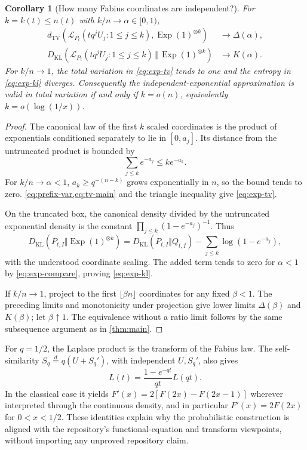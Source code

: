 \documentclass[11pt,a4paper]{article}
\numberwithin{equation}{section}
\newtheorem{corollary}[corollary]{Corollary}
\theoremstyle{definition}
\theoremstyle{remark}
\newcommand{\Pt}{P_t}
\newcommand{\TV}{d_{\mathrm{TV}}}
\newcommand{\KL}{D_{\mathrm{KL}}}
\newcommand{\Exp}{\operatorname{Exp}}
\newcommand{\Law}{\mathcal L}
\begin{document}
\begin{corollary}[How many Fabius coordinates are independent?]
\label{cor:geometric-prefix}
For $k=k(t)\le n(t)$ with $k/n\to\alpha\in[0,1)$,
\begin{align}
 \TV\left(\Law_{\Pt}(tq^jU_j:1\le j\le k),\Exp(1)^{\otimes k}\right)
 &\to\Delta(\alpha),\label{eq:exp-tv}\\
 \KL\left(\Law_{\Pt}(tq^jU_j:1\le j\le k)
       \,\Vert\,\Exp(1)^{\otimes k}\right)&\to K(\alpha).
 \label{eq:exp-kl}
\end{align}
For $k/n\to1$, the total variation in \cref{eq:exp-tv} tends to
one and the entropy in \cref{eq:exp-kl} diverges. Consequently the
independent-exponential approximation is valid in total variation
if and only if $k=o(n)$, equivalently $k=o(\log(1/x))$.
\end{corollary}
\begin{proof}
The canonical law of the first $k$ scaled coordinates is the product
of exponentials conditioned separately to lie in $[0,a_j]$.
Its distance from the untruncated product is bounded by
\begin{equation}\label{eq:exp-compare}
 \sum_{j\le k}e^{-a_j}\le k e^{-a_k}.
\end{equation}
For $k/n\to\alpha<1$, $a_k\ge q^{-(n-k)}$ grows exponentially in
$n$, so the bound tends to zero. \cref{eq:prefix-var,eq:tv-main} and the triangle inequality give
\cref{eq:exp-tv}.

On the truncated box, the canonical density divided by the
untruncated exponential density is the constant
$\prod_{j\le k}(1-e^{-a_j})^{-1}$. Thus
\[
 \KL(P_{t,I}\Vert\Exp(1)^{\otimes k})
 =\KL(P_{t,I}\Vert Q_{t,I})
       -\sum_{j\le k}\log(1-e^{-a_j}),
\]
with the understood coordinate scaling. The added term tends to
zero for $\alpha<1$ by \cref{eq:exp-compare}, proving
\cref{eq:exp-kl}.

If $k/n\to1$, project to the first $\lfloor\beta n\rfloor$
coordinates for any fixed $\beta<1$. The preceding limits and
monotonicity under projection give lower limits $\Delta(\beta)$
and $K(\beta)$; let $\beta\uparrow1$. The equivalence without a
ratio limit follows by the same subsequence argument as in
\cref{thm:main}.
\end{proof}

For $q=1/2$, the Laplace product is the transform of the Fabius law.
The self-similarity $S_q\overset d=q(U+S_q')$, with independent
$U,S_q'$, also gives
\[
 L(t)=\frac{1-e^{-qt}}{qt}L(qt).
\]
In the classical case it yields
$F'(x)=2[F(2x)-F(2x-1)]$ wherever interpreted through the continuous
density, and in particular $F'(x)=2F(2x)$ for $0<x<1/2$.
These identities explain why the probabilistic construction is
aligned with the repository's functional-equation and transform
viewpoints, without importing any unproved repository claim.
\end{document}
